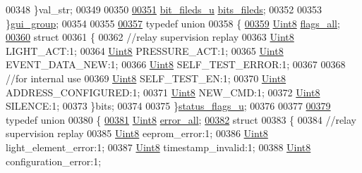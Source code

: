\begin{DoxyCode}
00348     \}val\_str;
00349 
00350 
\hypertarget{a00004_source_l00351}{}\hyperlink{a00004_a37d24c00aef216555f2459d32bbcb21b}{00351}      \hyperlink{a00004_d9/db6/a00146}{bit\_fileds\_u} \hyperlink{a00004_a37d24c00aef216555f2459d32bbcb21b}{bits\_fileds};
00352     
00353 \}\hyperlink{a00004_dd/da7/a00168}{gui\_group};
00354 
00355 
\hypertarget{a00004_source_l00357}{}\hyperlink{a00004}{00357} \textcolor{keyword}{typedef} \textcolor{keyword}{union}
00358 \{
\hypertarget{a00004_source_l00359}{}\hyperlink{a00004_a2d5067795eb39162534e06fa9f6ac76c}{00359}     \hyperlink{a00004_a979e3e23b9a449e69ab6a8a83b6042f8}{Uint8} \hyperlink{a00004_a2d5067795eb39162534e06fa9f6ac76c}{flags\_all};
\hypertarget{a00004_source_l00360}{}\hyperlink{a00004}{00360}     \textcolor{keyword}{struct}
00361     \{
00362         \textcolor{comment}{//relay supervision replay}
00363         \hyperlink{a00004_a979e3e23b9a449e69ab6a8a83b6042f8}{Uint8} LIGHT\_ACT:1;
00364         \hyperlink{a00004_a979e3e23b9a449e69ab6a8a83b6042f8}{Uint8} PRESSURE\_ACT:1;
00365         \hyperlink{a00004_a979e3e23b9a449e69ab6a8a83b6042f8}{Uint8} EVENT\_DATA\_NEW:1;
00366         \hyperlink{a00004_a979e3e23b9a449e69ab6a8a83b6042f8}{Uint8} SELF\_TEST\_ERROR:1;
00367 
00368         \textcolor{comment}{//for internal use}
00369         \hyperlink{a00004_a979e3e23b9a449e69ab6a8a83b6042f8}{Uint8} SELF\_TEST\_EN:1;
00370         \hyperlink{a00004_a979e3e23b9a449e69ab6a8a83b6042f8}{Uint8} ADDRESS\_CONFIGURED:1;
00371         \hyperlink{a00004_a979e3e23b9a449e69ab6a8a83b6042f8}{Uint8} NEW\_CMD:1;
00372         \hyperlink{a00004_a979e3e23b9a449e69ab6a8a83b6042f8}{Uint8} SILENCE:1;
00373     \}bits;
00374 
00375 \}\hyperlink{a00004_dc/d55/a00226}{status\_flags\_u};
00376 
00377 
\hypertarget{a00004_source_l00379}{}\hyperlink{a00004}{00379} \textcolor{keyword}{typedef} \textcolor{keyword}{union}
00380 \{
\hypertarget{a00004_source_l00381}{}\hyperlink{a00004_a5a1595d8eaf32825fc6cd8f7d5504231}{00381}     \hyperlink{a00004_a979e3e23b9a449e69ab6a8a83b6042f8}{Uint8} \hyperlink{a00004_a5a1595d8eaf32825fc6cd8f7d5504231}{error\_all};
\hypertarget{a00004_source_l00382}{}\hyperlink{a00004}{00382}     \textcolor{keyword}{struct}
00383     \{
00384         \textcolor{comment}{//relay supervision replay}
00385         \hyperlink{a00004_a979e3e23b9a449e69ab6a8a83b6042f8}{Uint8} eeprom\_error:1;
00386         \hyperlink{a00004_a979e3e23b9a449e69ab6a8a83b6042f8}{Uint8} light\_element\_error:1;
00387         \hyperlink{a00004_a979e3e23b9a449e69ab6a8a83b6042f8}{Uint8} timestamp\_invalid:1;
00388         \hyperlink{a00004_a979e3e23b9a449e69ab6a8a83b6042f8}{Uint8} configuration\_error:1;

\end{DoxyCode}
